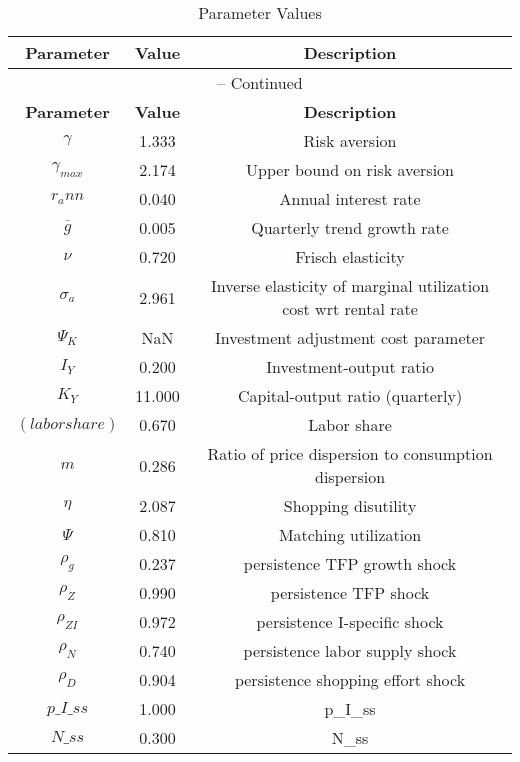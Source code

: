 \begin{center}
\begin{longtable}{ccc}
\caption{Parameter Values}\\%
\toprule%
\multicolumn{1}{c}{\textbf{Parameter}} &
\multicolumn{1}{c}{\textbf{Value}} &
 \multicolumn{1}{c}{\textbf{Description}}\\%
\midrule%
\endfirsthead
\multicolumn{3}{c}{{\tablename} \thetable{} -- Continued}\\%
\midrule%
\multicolumn{1}{c}{\textbf{Parameter}} &
\multicolumn{1}{c}{\textbf{Value}} &
  \multicolumn{1}{c}{\textbf{Description}}\\%
\midrule%
\endhead
${\gamma}$ 	 & 	 1.333 	 & 	 Risk aversion\\
${\gamma_{max}}$ 	 & 	 2.174 	 & 	 Upper bound on risk aversion\\
${r_ann}$ 	 & 	 0.040 	 & 	 Annual interest rate\\
${\overline{g}}$ 	 & 	 0.005 	 & 	 Quarterly trend growth rate\\
$\nu$ 	 & 	 0.720 	 & 	 Frisch elasticity\\
${\sigma_a}$ 	 & 	 2.961 	 & 	 Inverse elasticity of marginal utilization cost wrt rental rate\\
${\Psi_K}$ 	 & 	  NaN 	 & 	 Investment adjustment cost parameter\\
${I_Y}$ 	 & 	 0.200 	 & 	 Investment-output ratio\\
${K_Y}$ 	 & 	 11.000 	 & 	 Capital-output ratio (quarterly)\\
$(labor share)$ 	 & 	 0.670 	 & 	 Labor share\\
${m}$ 	 & 	 0.286 	 & 	 Ratio of price dispersion to consumption dispersion\\
${\eta}$ 	 & 	 2.087 	 & 	 Shopping disutility\\
${\Psi}$ 	 & 	 0.810 	 & 	 Matching utilization\\
${\rho_g}$ 	 & 	 0.237 	 & 	 persistence TFP growth shock\\
${\rho_Z}$ 	 & 	 0.990 	 & 	 persistence TFP shock\\
${\rho_{ZI}}$ 	 & 	 0.972 	 & 	 persistence I-specific shock\\
${\rho_N}$ 	 & 	 0.740 	 & 	 persistence labor supply shock\\
${\rho_D}$ 	 & 	 0.904 	 & 	 persistence shopping effort shock\\
$p\_I\_ss$ 	 & 	 1.000 	 & 	 p\_I\_ss\\
$N\_ss$ 	 & 	 0.300 	 & 	 N\_ss\\
\bottomrule%
\end{longtable}
\end{center}
